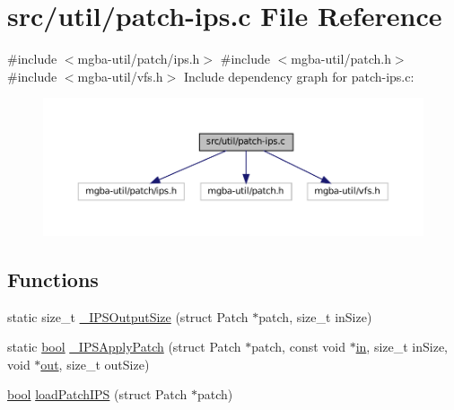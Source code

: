 \hypertarget{patch-ips_8c}{}\section{src/util/patch-\/ips.c File Reference}
\label{patch-ips_8c}
{\ttfamily \#include $<$mgba-\/util/patch/ips.\+h$>$}\newline
{\ttfamily \#include $<$mgba-\/util/patch.\+h$>$}\newline
{\ttfamily \#include $<$mgba-\/util/vfs.\+h$>$}\newline
Include dependency graph for patch-\/ips.c\+:
\nopagebreak
\begin{figure}[H]
\begin{center}
\leavevmode
\includegraphics[width=350pt]{patch-ips_8c__incl}
\end{center}
\end{figure}
\subsection*{Functions}
\begin{DoxyCompactItemize}
\item 
static size\+\_\+t \mbox{\hyperlink{patch-ips_8c_a7a563fa349ed7b67a6d504fd40efc92e}{\+\_\+\+I\+P\+S\+Output\+Size}} (struct Patch $\ast$patch, size\+\_\+t in\+Size)
\item 
static \mbox{\hyperlink{libretro_8h_a4a26dcae73fb7e1528214a068aca317e}{bool}} \mbox{\hyperlink{patch-ips_8c_ad571623fdebecb3eb9d9bf7d1c56569e}{\+\_\+\+I\+P\+S\+Apply\+Patch}} (struct Patch $\ast$patch, const void $\ast$\mbox{\hyperlink{gun_8c_a8bab68b4d22f69428207fabb60dc4f5c}{in}}, size\+\_\+t in\+Size, void $\ast$\mbox{\hyperlink{gun_8c_acb2d4658684492100bc328998f52ae82}{out}}, size\+\_\+t out\+Size)
\item 
\mbox{\hyperlink{libretro_8h_a4a26dcae73fb7e1528214a068aca317e}{bool}} \mbox{\hyperlink{patch-ips_8c_ac86a44af7cc9232c26a9c1fbfd2cea40}{load\+Patch\+I\+PS}} (struct Patch $\ast$patch)
\end{DoxyCompactItemize}


